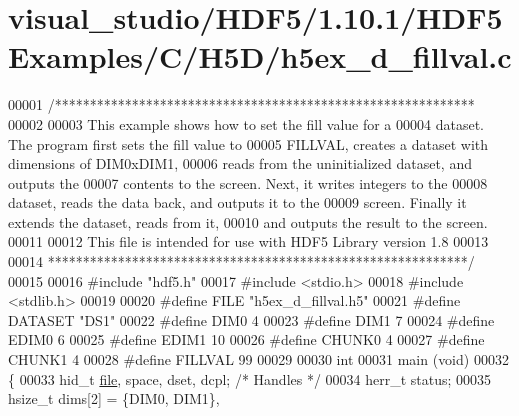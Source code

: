 \hypertarget{visual__studio_2_h_d_f5_21_810_81_2_h_d_f5_examples_2_c_2_h5_d_2h5ex__d__fillval_8c_source}{}\section{visual\+\_\+studio/\+H\+D\+F5/1.10.1/\+H\+D\+F5\+Examples/\+C/\+H5\+D/h5ex\+\_\+d\+\_\+fillval.c}
\label{visual__studio_2_h_d_f5_21_810_81_2_h_d_f5_examples_2_c_2_h5_d_2h5ex__d__fillval_8c_source}

\begin{DoxyCode}
00001 \textcolor{comment}{/************************************************************}
00002 \textcolor{comment}{}
00003 \textcolor{comment}{  This example shows how to set the fill value for a}
00004 \textcolor{comment}{  dataset.  The program first sets the fill value to}
00005 \textcolor{comment}{  FILLVAL, creates a dataset with dimensions of DIM0xDIM1,}
00006 \textcolor{comment}{  reads from the uninitialized dataset, and outputs the}
00007 \textcolor{comment}{  contents to the screen.  Next, it writes integers to the}
00008 \textcolor{comment}{  dataset, reads the data back, and outputs it to the}
00009 \textcolor{comment}{  screen.  Finally it extends the dataset, reads from it,}
00010 \textcolor{comment}{  and outputs the result to the screen.}
00011 \textcolor{comment}{}
00012 \textcolor{comment}{  This file is intended for use with HDF5 Library version 1.8}
00013 \textcolor{comment}{}
00014 \textcolor{comment}{ ************************************************************/}
00015 
00016 \textcolor{preprocessor}{#include "hdf5.h"}
00017 \textcolor{preprocessor}{#include <stdio.h>}
00018 \textcolor{preprocessor}{#include <stdlib.h>}
00019 
00020 \textcolor{preprocessor}{#define FILE            "h5ex\_d\_fillval.h5"}
00021 \textcolor{preprocessor}{#define DATASET         "DS1"}
00022 \textcolor{preprocessor}{#define DIM0            4}
00023 \textcolor{preprocessor}{#define DIM1            7}
00024 \textcolor{preprocessor}{#define EDIM0           6}
00025 \textcolor{preprocessor}{#define EDIM1           10}
00026 \textcolor{preprocessor}{#define CHUNK0          4}
00027 \textcolor{preprocessor}{#define CHUNK1          4}
00028 \textcolor{preprocessor}{#define FILLVAL         99}
00029 
00030 \textcolor{keywordtype}{int}
00031 main (\textcolor{keywordtype}{void})
00032 \{
00033     hid\_t           \hyperlink{structfile}{file}, space, dset, dcpl;    \textcolor{comment}{/* Handles */}
00034     herr\_t          status;
00035     hsize\_t         dims[2] = \{DIM0, DIM1\},

\end{DoxyCode}
